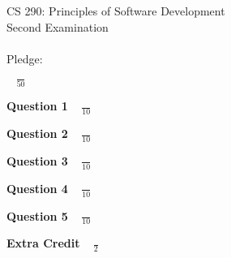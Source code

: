 \documentclass[12pt]{article}
\begin{document}
\vspace*{3in}

\begin{center}

CS 290: Principles of Software Development \\
Second Examination  \\ \mbox{} \\
Pledge: \\

\vspace*{.5in}

{\LARGE $\;\;\;\frac{}{50}$ }

\end{center}

\newpage

{\bf Question 1} {\Large $\;\;\;\frac{}{10}$ }

\newpage

{\bf Question 2} {\Large $\;\;\; \frac{}{10}$ }

\newpage

{\bf Question 3} {\Large $\;\;\; \frac{}{10}$ }

\newpage

{\bf Question 4} {\Large $\;\;\; \frac{}{10}$ }

\newpage

{\bf Question 5} {\Large $\;\;\; \frac{}{10}$ }

\newpage

{\bf Extra Credit} {\Large $\;\;\; \frac{}{2}$ }
\end{document}
